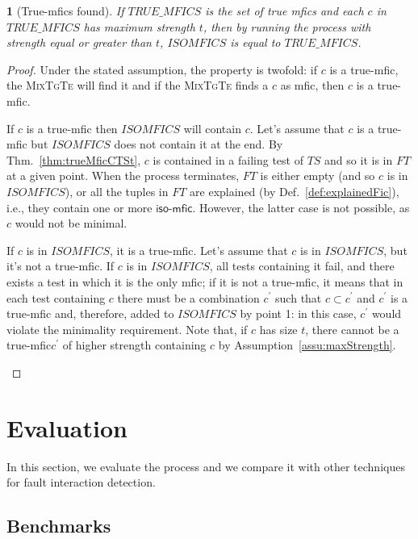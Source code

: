 \documentclass[
12pt, %
oneside, %
english, %
singlespacing, %
headsepline, %
consistentlayout, %
]{MastersDoctoralThesis} %
\newcommand{\mix}{\textsc{MixTgTe}\xspace}
\newcommand{\truemfic}{true-\textsf{mfic}\xspace}
\newcommand{\mfic}{\textsf{mfic}\xspace}
\newcommand{\mfics}{\textsf{mfics}\xspace}
\newcommand{\ts}{\ensuremath{\mathit{TS}}\xspace}
\newcommand{\ft}{\ensuremath{\mathit{FT}}\xspace}
\newcommand{\isoMficsSet}{\ensuremath{\mathit{ISOMFICS}}\xspace}
\newcommand{\trueMficsSet}{\ensuremath{\mathit{TRUE\_MFICS}}\xspace}
\newcommand{\isoMfic}{\ensuremath{\textsf{iso-mfic}}\xspace}
\newtheorem{thm}{\protect\theoremname}
\providecommand{\theoremname}{Theorem}
\theoremstyle{plain}
\theoremstyle{definition}
\theoremstyle{remark}
\theoremstyle{plain}
\theoremstyle{plain}
\providecommand{\theoremname}{Theorem}
\theoremstyle{remark}
\begin{document}
\begin{thm}[True-\mfics found]\label{thm:trueMficsFound}
	If \trueMficsSet is the set of true \mfics and each $c$ in \trueMficsSet has maximum strength $t$, then by running the process with strength equal or greater than $t$, \isoMficsSet is equal to \trueMficsSet.
\end{thm}

\begin{proof}
	Under the stated assumption, the property is twofold: if $c$ is a \truemfic, the \mix will find it and if the \mix finds a $c$ as \mfic, then $c$ is a \truemfic.
	\begin{compactenum}
		\item If $c$ is a \truemfic then \isoMficsSet will contain $c$. Let's assume that $c$ is a \truemfic but \isoMficsSet does not contain it at the end. By Thm.~\ref{thm:trueMficCTSt}, $c$ is contained in a failing test of \ts and so it is in \ft at a given point. When the process terminates, \ft is either empty (and so $c$ is in \isoMficsSet), or all the tuples in \ft are explained (by Def.~\ref{def:explainedFic}), i.e., they contain one or more \isoMfic. However, the latter case is not possible, as $c$ would not be minimal.
		\item If $c$ is in \isoMficsSet, it is a \truemfic. Let's assume that $c$ is in \isoMficsSet, but it's not a \truemfic. If $c$ is in \isoMficsSet, all tests containing it fail, and there exists a test in which it is the only \mfic; if it is not a \truemfic, it means that in each test containing $c$ there must be a combination $c^\prime$ such that $c \subset c^\prime$ and $c^\prime$ is a \truemfic and, therefore, added to \isoMficsSet by point 1: in this case, $c^\prime$ would violate the minimality requirement. Note that, if $c$ has size $t$, there cannot be a \truemfic $c^\prime$ of higher strength containing $c$ by Assumption~\ref{assu:maxStrength}.
	\end{compactenum}
\end{proof}


\section{Evaluation}\label{sec:evaluation}

In this section, we evaluate the process and we compare it with other techniques for fault interaction detection.

\subsection{Benchmarks}\label{sec:benchmarks}
\end{document}
